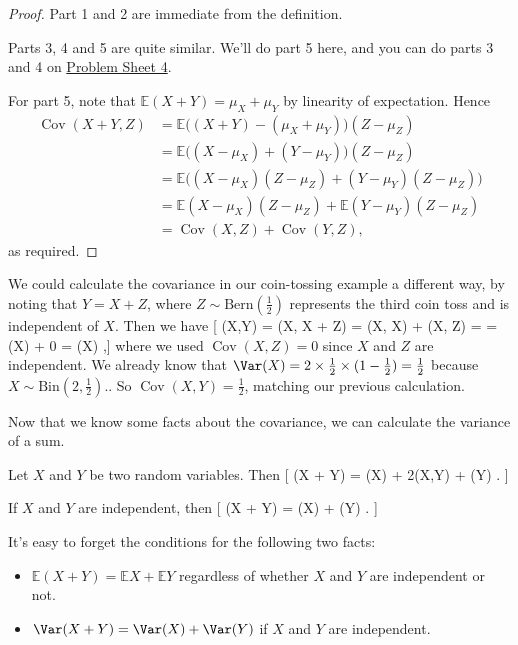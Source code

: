 \documentclass[
  letterpaper,
  DIV=11,
  numbers=noendperiod]{scrreprt}
\providecommand{\tightlist}{%
  \setlength{\itemsep}{0pt}\setlength{\parskip}{0pt}}\usepackage{longtable,booktabs,array}
\theoremstyle{remark}
\begin{document}
\begin{proof}

Part 1 and 2 are immediate from the definition.

Parts 3, 4 and 5 are quite similar. We'll do part 5 here, and you can do
parts 3 and 4 on \protect\hyperlink{P4}{Problem Sheet 4}.

For part 5, note that \(\mathbb E(X + Y) = \mu_X + \mu_Y\) by linearity
of expectation. Hence \begin{align*}
\operatorname{Cov}(X + Y, Z)
  &= \mathbb E \big((X + Y) - (\mu_X + \mu_Y)\big)(Z - \mu_Z) \\
  &= \mathbb E \big((X - \mu_X) + (Y - \mu_Y)\big)(Z - \mu_Z) \\
  &= \mathbb E \big((X - \mu_X)(Z - \mu_Z) + (Y - \mu_Y) (Z - \mu_Z) \big) \\
  &= \mathbb E (X - \mu_X)(Z - \mu_Z) + \mathbb E  (Y - \mu_Y) (Z - \mu_Z) \\
  &= \operatorname{Cov}(X,Z) + \operatorname{Cov}(Y,Z) ,
\end{align*} as required.

\end{proof}

We could calculate the covariance in our coin-tossing example a
different way, by noting that \(Y = X + Z\), where
\(Z \sim \text{Bern}(\frac12)\) represents the third coin toss and is
independent of \(X\). Then we have {[} (X,Y) =
(X, X + Z) = (X, X) +
(X, Z) = = \Var(X) + 0 = \Var(X) ,{]} where we used
\(\operatorname{Cov}(X, Z) = 0\) since \(X\) and \(Z\) are independent.
We already know that
\(\Var(X) = 2 \times \tfrac12 \times (1 - \tfrac12) = \tfrac12\) because
\(X \sim \text{Bin}(2, \frac12)\).. So
\(\operatorname{Cov}(X,Y) = \frac12\), matching our previous
calculation.

Now that we know some facts about the covariance, we can calculate the
variance of a sum.

Let \(X\) and \(Y\) be two random variables. Then {[} \Var(X + Y) =
\Var(X) + 2(X,Y) + \Var(Y) . {]}

If \(X\) and \(Y\) are independent, then {[} \Var(X + Y) = \Var(X) +
\Var(Y) . {]}

It's easy to forget the conditions for the following two facts:

\begin{itemize}
\tightlist
\item
  \(\mathbb E(X + Y) = \mathbb EX + \mathbb EY\) regardless of whether
  \(X\) and \(Y\) are independent or not.
\item
  \(\Var(X+Y) = \Var(X) + \Var(Y)\) if \(X\) and \(Y\) are independent.
\end{itemize}
\end{document}
